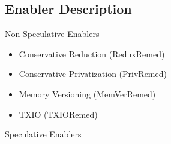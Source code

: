 \subsection{Enabler Description}

Non Speculative Enablers

\begin{itemize}
    \item Conservative Reduction (ReduxRemed)

    \item Conservative Privatization (PrivRemed)

    \item Memory Versioning (MemVerRemed)


    \item TXIO (TXIORemed)

\end{itemize}

Speculative Enablers

